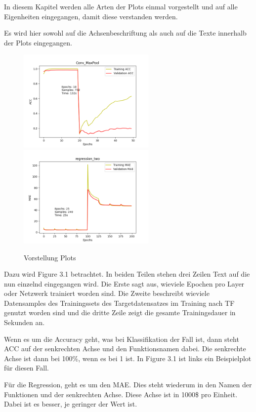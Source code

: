 In diesem Kapitel werden alle Arten der Plots einmal vorgestellt und auf alle Eigenheiten eingegangen, damit diese verstanden werden. 

Es wird hier sowohl auf die Achsenbeschriftung als auch auf die Texte innerhalb der Plots eingegangen. 

\begin{figure}[htpb]
    \includegraphics[height=5cm]{../../Plots/ba_plots/convmaxpool/2TFtr.png}
    \includegraphics[height=5cm]{../../Plots/ba_plots/regr2/regr2train.png}
    \caption{\label{fig:ploterkl} Vorstellung Plots}
\end{figure}

Dazu wird Figure 3.1 betrachtet. In beiden Teilen stehen drei Zeilen Text auf die nun einzelnd eingegangen wird. Die Erste sagt aus, 
wieviele Epochen pro Layer oder Netzwerk trainiert worden sind. Die Zweite beschreibt wieviele Datensamples des Trainingssets des 
Targetdatensatzes im Training nach TF genutzt worden sind und die dritte Zeile zeigt die gesamte Trainingsdauer in Sekunden an. 

Wenn es um die Accuracy geht, was bei Klassifikation der Fall ist, dann steht ACC auf der senkrechten Achse und den Funktionsnamen dabei. 
Die senkrechte Achse ist dann bei 100\%, wenn es bei 1 ist. In Figure 3.1 ist links ein Beispielplot für diesen Fall. 

Für die Regression, geht es um den MAE. Dies steht wiederum in den Namen der Funktionen und der senkrechten Achse. Diese Achse ist in 1000\$ pro 
Einheit. Dabei ist es besser, je geringer der Wert ist. 
